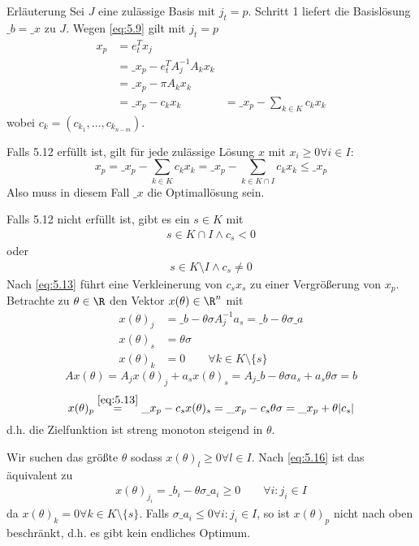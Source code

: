 \documentclass{mycourse}
\begin{document}
\begin{note}{Erläuterung}
	Sei $J$ eine zulässige Basis mit $j_t=p$.
	Schritt 1 liefert die Basislösung $\_b = \_x$ zu $J$.
	Wegen \ref{eq:5.9} gilt mit $j_t = p$
	\begin{align}
		x_p &= e_t^Tx_j \\
			   &= \_x_p - e_t^T A_j^{-1}A_kx_k \tag{5.13}\label{eq:5.13} \\
			   &= \_x_p - \pi A_kx_k \\
			   &= \_x_p - c_kx_k
		&= \_x_p - \sum_{k\in K}c_k x_k
	\end{align}
	\setcounter{equation}{13}
	wobei $c_k = (c_{k_1}, \dotsc, c_{k_{n-m}})$.
	
	Falls 5.12 erfüllt ist, gilt für jede zulässige Lösung $x$ mit $x_i \ge 0 \forall i\in I$: %
	\[
		x_p = \_x_p - \sum_{k\in K}c_k x_k = \_x_p - \sum_{k\in K\cap I}c_k x_k \le \_x_p
	\]
	Also muss in diesem Fall $\_x$ die Optimallösung sein.
	
	Falls 5.12 nicht erfüllt ist, gibt es ein $s\in K$ mit %
	\begin{align}
		\label{eq:5.14} 
		s\in K \cap I \land c_s < 0
	\end{align}
	oder
	\begin{align}
		\label{eq:5.15}
		s\in K\setminus I \land c_s \neq 0
	\end{align}
	Nach \ref{eq:5.13} führt eine Verkleinerung von $c_sx_s$ zu einer Vergrößerung von $x_p$.
	Betrachte zu $\theta\in \R$ den Vektor $x(\theta) \in \R^n$ mit
	\begin{align*}
		x(\theta)_j &= \_b - \theta \sigma A_j^{-1}a_s = \_b - \theta \sigma \_a\\
		x(\theta)_s &= \theta \sigma\\
		x(\theta)_k &= 0 \qquad \forall k\in K\setminus \{s\}
	\end{align*}
	\[
		Ax(\theta) = A_j x(\theta)_j + a_s x(\theta)_s = A_j\_b - \theta \sigma a_s + a_s \theta \sigma = b
	\]
	\begin{equation*}
		x(\theta)_p \stackrel{\ref{eq:5.13}}= \_x_p -c_s x(\theta)_s = \_x_p - c_s \theta \sigma = \_x_p + \theta |c_s|
	\end{equation*}
	d.h. die Zielfunktion ist streng monoton steigend in $\theta$.

	Wir suchen das größte $\theta$ sodass $x(\theta)_l \ge 0 \forall l\in I$.
	Nach \ref{eq:5.16} ist das äquivalent zu
	\begin{align}
		\label{eq:5.16}
		x(\theta)_{j_i} = \_b_i - \theta \sigma \_a_i \ge 0 \qquad \forall i : j_i \in I
	\end{align}
	da $x(\theta)_k=0 \forall k\in K\setminus \{s\}$.
	Falls $\sigma \_a_i \le 0 \forall i: j_i \in I$, so ist $x(\theta)_p$ nicht nach oben beschränkt, d.h. es gibt kein endliches Optimum.


\end{note}
\end{document}
